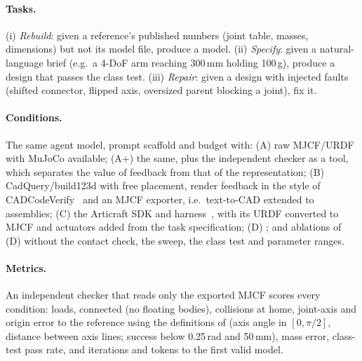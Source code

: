 \paragraph{Tasks.} (i) \emph{Rebuild}: given a reference's published numbers (joint table,
masses, dimensions) but not its model file, produce a model. (ii) \emph{Specify}: given a
natural-language brief (e.g.\ a 4-DoF arm reaching 300\,mm holding 100\,g), produce a design that
passes the class test. (iii) \emph{Repair}: given a design with injected faults (shifted
connector, flipped axis, oversized parent blocking a joint), fix it.

\paragraph{Conditions.} The same agent model, prompt scaffold and budget with: (A) raw MJCF/URDF
with MuJoCo available; (A+) the same, plus the independent checker as a tool, which separates the
value of feedback from that of the representation; (B) CadQuery/build123d with free placement,
render feedback in the style of CADCodeVerify~\citep{alrashedy2025cadcodeverify} and an MJCF
exporter, i.e.\ text-to-CAD extended to assemblies; (C) the Articraft SDK and
harness~\citep{zhou2026articraft}, with its URDF converted to MJCF and actuators added from the task
specification; (D) \ms; and ablations of (D) without the contact check, the sweep, the class test
and parameter ranges.

\paragraph{Metrics.} An independent checker that reads only the exported MJCF scores every
condition: loads, connected (no floating bodies), collisions at home, joint-axis and origin error
to the reference using the definitions of \citet{le2025articulateanything} (axis angle in
$[0,\pi/2]$, distance between axis lines; success below 0.25\,rad and 50\,mm), mass error,
class-test pass rate, and iterations and tokens to the first valid model.

